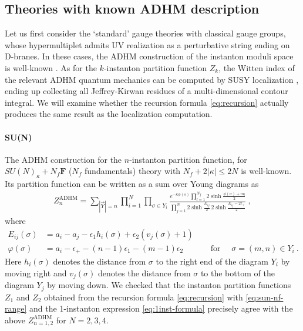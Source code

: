 \documentclass[letterpaper, 11pt]{article}
\def\e{\epsilon}
\def\s{\sigma}
\begin{document}
{\subsection{Theories with known ADHM description}
\label{subsec:ex-adhm}

Let us first consider the `standard' gauge theories with classical gauge groups, whose hypermultiplet admits UV realization as a perturbative string ending on D-branes. In these cases, the ADHM construction of the instanton moduli space is well-known \cite{Atiyah:1978ri,Nekrasov:2002qd,Shadchin:2005mx}. 
As for the $k$-instanton partition function $Z_k$, the Witten index of the relevant ADHM quantum mechanics can be computed by SUSY localization \cite{Kim:2011mv, Hwang:2014uwa,Hwang:2016gfw, Lee:2017lfw}, ending up collecting all Jeffrey-Kirwan residues of a multi-dimensional contour integral. We will examine whether the recursion formula \eqref{eq:recursion} actually produces  the same result as the localization computation.

\paragraph{SU(N)}

The ADHM construction for the $n$-instanton partition function, for $SU(N)_\kappa +N_f \mathbf{F}$ ($N_f$ fundamentals) theory with $N_f + 2|\kappa| \leq 2N$ is well-known. Its partition function can be written as a sum over Young diagrams as
\begin{align}
  \label{eq:SUn-young}
  Z_n^\text{ADHM} = \sum_{|\vec{Y}| = n}\prod_{i=1}^N\prod_{\s \in Y_i}\frac{e^{-\kappa \phi(s)} \prod_{l=1}^{N_f} 2\sinh{\frac{\phi(\s)+m_l}{2}}  }{\prod_{j=1}^N 2\sinh{\frac{E_{ij}}{2}}\,2\sinh{\frac{E_{ij}-2\e_+}{2}}} \ , 
\end{align}
where
\begin{align*}
  E_{ij}(\s) &= a_i - a_j - \e_1 h_i(\s)+ \e_2(v_j(\s)+1)\\
  \varphi(\s)&= a_i  -\e_+-(n-1)\e_1-(m-1)\e_2
   \quad \qquad\text{ for }\quad \s = (m,n) \in Y_i \ . 
\end{align*}
Here $h_i(\s)$ denotes the distance from $\s$ to the right end of the diagram $Y_i$ by moving right and $v_j(\s)$ denotes the distance from $\s$ to the bottom of the diagram $Y_j$ by moving down.
We checked that the instanton partition functions $Z_1$ and $Z_2$ obtained from the recursion formula \eqref{eq:recursion} with \eqref{eq:sun-nf-range} and the 1-instanton expression \eqref{eq:1inst-formula} precisely agree with the above  $Z_{n=1,2}^\text{ADHM}$ for $N=2,3,4$. 

}
\end{document}
